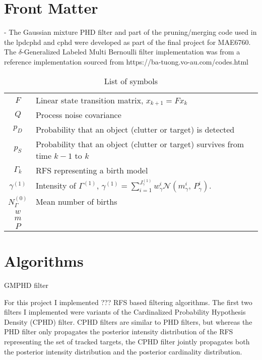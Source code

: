 \documentclass{article}
\begin{document}
\section*{Front Matter}
- The Gaussian mixture PHD filter and part of the pruning/merging code used in the lpdcphd and cphd were developed as part of the final project for MAE6760. The $\delta$-Generalized Labeled Multi Bernoulli filter implementation was from a reference implementation sourced from https://ba-tuong.vo-au.com/codes.html


\begin{table}[h]
  \begin{center}
    \begin{tabular}{ c l } 
      $F$ & Linear state transition matrix, $x_{k+1} = Fx_k$ \\
      $Q$ & Process noise covariance \\
      $p_{D}$ & Probability that an object (clutter or target) is detected\\
      $p_{S}$ & Probability that an object (clutter or target) survives from time $k-1$ to $k$\\
      $\Gamma_k$ & RFS representing a birth model\\
      $\gamma^{(1)}$ & Intensity of $\Gamma^{(1)}$, $\gamma^{(1)} = \sum_{i=1}^{J_{\gamma}^{(1)}}w_{\gamma}^i \mathcal{N}(m_{\gamma}^i,\,P_{\gamma}^i)$.\\
      $N_{\Gamma}^{(0)}$ & Mean number of births \\
      $w$ & \\
      $m$ & \\
      $P$ & \\
    \end{tabular}
  \end{center}
  \caption{\label{tab:variables}List of symbols}
\end{table}


\section*{Algorithms}
GMPHD filter\cite{gmphd}

For this project I implemented ??? RFS based filtering algorithms. The first two filters I implemented were variants of the Cardinalized Probability Hypothesis Density (CPHD) filter. CPHD filters are similar to PHD filters, but whereas the PHD filter only propagates the posterior intensity distribution of the RFS representing the set of tracked targets, the CPHD filter jointly propagates both the posterior intensity distribution and the posterior cardinality distribution.
\end{document}
